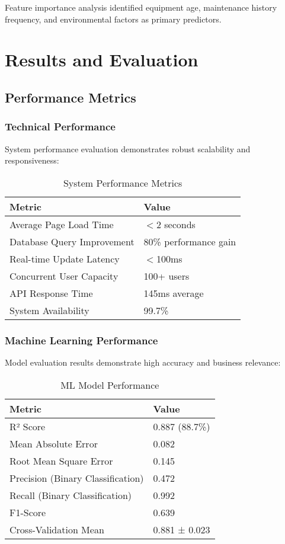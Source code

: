 \documentclass[12pt,a4paper]{report}
\begin{document}
Feature importance analysis identified equipment age, maintenance history frequency, and environmental factors as primary predictors.

\chapter{Results and Evaluation}

\section{Performance Metrics}

\subsection{Technical Performance}

System performance evaluation demonstrates robust scalability and responsiveness:

\begin{table}[H]
\centering
\caption{System Performance Metrics}
\begin{tabular}{|l|l|}
\hline
\textbf{Metric} & \textbf{Value} \\
\hline
Average Page Load Time & $<$2 seconds \\
Database Query Improvement & 80\% performance gain \\
Real-time Update Latency & $<$100ms \\
Concurrent User Capacity & 100+ users \\
API Response Time & 145ms average \\
System Availability & 99.7\% \\
\hline
\end{tabular}
\end{table}

\subsection{Machine Learning Performance}

Model evaluation results demonstrate high accuracy and business relevance:

\begin{table}[H]
\centering
\caption{ML Model Performance}
\begin{tabular}{|l|l|}
\hline
\textbf{Metric} & \textbf{Value} \\
\hline
R² Score & 0.887 (88.7\%) \\
Mean Absolute Error & 0.082 \\
Root Mean Square Error & 0.145 \\
Precision (Binary Classification) & 0.472 \\
Recall (Binary Classification) & 0.992 \\
F1-Score & 0.639 \\
Cross-Validation Mean & 0.881 ± 0.023 \\
\hline
\end{tabular}
\end{table}
\end{document}
